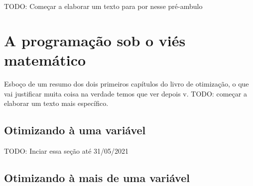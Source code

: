 TODO: Começar a elaborar um texto para por nesse pré-ambulo

\section{A programação sob o viés matemático}

Esboço de um resumo dos dois primeiros capítulos do livro de otimização, o que vai
justificar muita coisa na verdade temos que ver depois v.
TODO: começar a elaborar um texto mais específico.

\subsection{Otimizando à uma variável}
TODO: Inciar essa seção até 31/05/2021

\subsection{Otimizando à mais de uma variável}